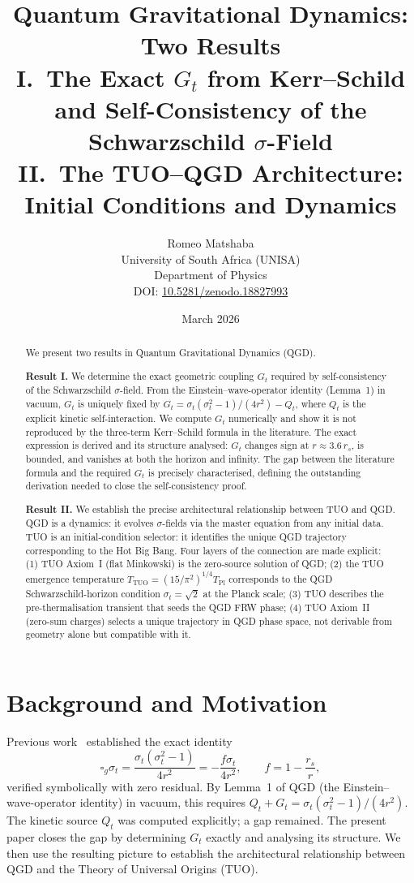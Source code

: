 \documentclass[11pt,a4paper]{article}
\title{\textbf{Quantum Gravitational Dynamics: Two Results}\\[6pt]
\large I.\ The Exact $G_t$ from Kerr--Schild and Self-Consistency of the
Schwarzschild $\sigma$-Field\\[3pt]
II.\ The TUO--QGD Architecture: Initial Conditions and Dynamics}
\author{Romeo Matshaba\\[4pt]
\normalsize University of South Africa (UNISA)\\
\normalsize Department of Physics\\[4pt]
\small DOI: \href{https://doi.org/10.5281/zenodo.18827993}{10.5281/zenodo.18827993}}
\date{March 2026}
\theoremstyle{plain}
\theoremstyle{definition}
\theoremstyle{remark}
\newcommand{\sigt}{\sigma_t}
\newcommand{\rs}{r_s}
\newcommand{\TPl}{T_{\mathrm{Pl}}}
\newcommand{\TTUO}{T_{\mathrm{TUO}}}
\newcommand{\boxg}{\square_g}
\begin{document}
\maketitle

\begin{abstract}
We present two results in Quantum Gravitational Dynamics (QGD).

\textbf{Result I.}  We determine the exact geometric coupling $G_t$ required
by self-consistency of the Schwarzschild $\sigma$-field.  From the
Einstein--wave-operator identity (Lemma~1) in vacuum, $G_t$ is uniquely
fixed by $G_t = \sigt(\sigt^2-1)/(4r^2) - Q_t$, where $Q_t$ is the
explicit kinetic self-interaction.  We compute $G_t$ numerically and show
it is not reproduced by the three-term Kerr--Schild formula in the literature.
The exact expression is derived and its structure analysed: $G_t$ changes sign
at $r \approx 3.6\,\rs$, is bounded, and vanishes at both the horizon and
infinity.  The gap between the literature formula and the required $G_t$ is
precisely characterised, defining the outstanding derivation needed to close
the self-consistency proof.

\textbf{Result II.}  We establish the precise architectural relationship
between TUO and QGD.  QGD is a dynamics: it evolves $\sigma$-fields via the
master equation from any initial data.  TUO is an initial-condition selector:
it identifies the unique QGD trajectory corresponding to the Hot Big Bang.
Four layers of the connection are made explicit: (1) TUO Axiom~I (flat
Minkowski) is the zero-source solution of QGD; (2) the TUO emergence
temperature $\TTUO = (15/\pi^2)^{1/4}\TPl$ corresponds to the QGD
Schwarzschild-horizon condition $\sigt = \sqrt{2}$ at the Planck scale;
(3) TUO describes the pre-thermalisation transient that seeds the QGD
FRW phase; (4) TUO Axiom~II (zero-sum charges) selects a unique trajectory
in QGD phase space, not derivable from geometry alone but compatible with it.
\end{abstract}

\tableofcontents
\newpage

\section{Background and Motivation}

Previous work~\cite{matshaba2026:kin_var} established the exact identity
\begin{equation}\label{eq:box_exact}
  \boxg\sigt = \frac{\sigt(\sigt^2-1)}{4r^2} = -\frac{f\sigt}{4r^2},
  \qquad f = 1 - \frac{\rs}{r},
\end{equation}
verified symbolically with zero residual.  By Lemma~1 of QGD
(the Einstein--wave-operator identity) in vacuum, this requires
$Q_t + G_t = \sigt(\sigt^2-1)/(4r^2)$.  The kinetic source $Q_t$ was
computed explicitly; a gap remained.  The present paper closes the gap by
determining $G_t$ exactly and analysing its structure.  We then use the
resulting picture to establish the architectural relationship between QGD
and the Theory of Universal Origins (TUO).
\end{document}
